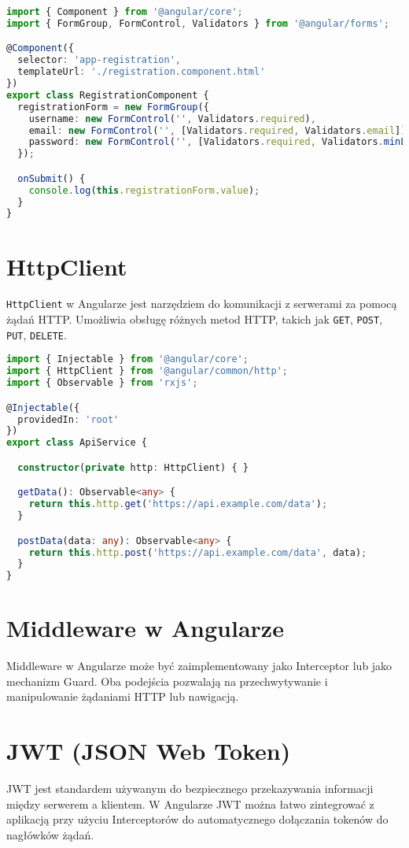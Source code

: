 \documentclass[a4paper,12pt]{article}
\begin{document}
\begin{lstlisting}[language=TypeScript, caption=Przykład Reactive Form]
import { Component } from '@angular/core';
import { FormGroup, FormControl, Validators } from '@angular/forms';

@Component({
  selector: 'app-registration',
  templateUrl: './registration.component.html'
})
export class RegistrationComponent {
  registrationForm = new FormGroup({
    username: new FormControl('', Validators.required),
    email: new FormControl('', [Validators.required, Validators.email]),
    password: new FormControl('', [Validators.required, Validators.minLength(6)]),
  });

  onSubmit() {
    console.log(this.registrationForm.value);
  }
}
\end{lstlisting}

\section{HttpClient}
\texttt{HttpClient} w Angularze jest narzędziem do komunikacji z serwerami za pomocą żądań HTTP. Umożliwia obsługę różnych metod HTTP, takich jak \texttt{GET}, \texttt{POST}, \texttt{PUT}, \texttt{DELETE}.

\begin{lstlisting}[language=TypeScript, caption=Przykład użycia HttpClient w Angularze]
import { Injectable } from '@angular/core';
import { HttpClient } from '@angular/common/http';
import { Observable } from 'rxjs';

@Injectable({
  providedIn: 'root'
})
export class ApiService {

  constructor(private http: HttpClient) { }

  getData(): Observable<any> {
    return this.http.get('https://api.example.com/data');
  }

  postData(data: any): Observable<any> {
    return this.http.post('https://api.example.com/data', data);
  }
}
\end{lstlisting}

\section{Middleware w Angularze}
Middleware w Angularze może być zaimplementowany jako Interceptor lub jako mechanizm Guard. Oba podejścia pozwalają na przechwytywanie i manipulowanie żądaniami HTTP lub nawigacją.

\section{JWT (JSON Web Token)}
JWT jest standardem używanym do bezpiecznego przekazywania informacji między serwerem a klientem. W Angularze JWT można łatwo zintegrować z aplikacją przy użyciu Interceptorów do automatycznego dołączania tokenów do nagłówków żądań.
\end{document}
